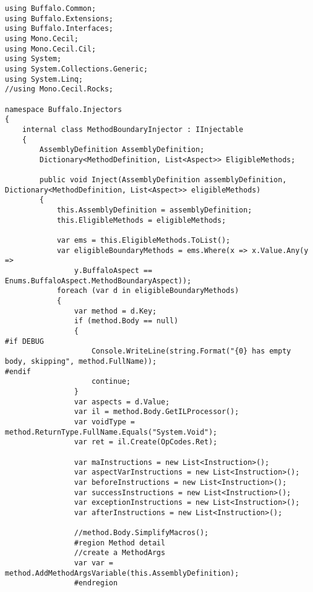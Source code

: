 \begin{lstlisting}[caption={../buffalo/Injectors/MethodBoundaryInjector.cs}, label=../buffalo/Injectors/MethodBoundaryInjector.cs, frame=tb, basicstyle=\scriptsize]﻿using Buffalo.Common;
using Buffalo.Extensions;
using Buffalo.Interfaces;
using Mono.Cecil;
using Mono.Cecil.Cil;
using System;
using System.Collections.Generic;
using System.Linq;
//using Mono.Cecil.Rocks;

namespace Buffalo.Injectors
{
    internal class MethodBoundaryInjector : IInjectable
    {
        AssemblyDefinition AssemblyDefinition;
        Dictionary<MethodDefinition, List<Aspect>> EligibleMethods;

        public void Inject(AssemblyDefinition assemblyDefinition, Dictionary<MethodDefinition, List<Aspect>> eligibleMethods)
        {
            this.AssemblyDefinition = assemblyDefinition;
            this.EligibleMethods = eligibleMethods;

            var ems = this.EligibleMethods.ToList();
            var eligibleBoundaryMethods = ems.Where(x => x.Value.Any(y =>
                y.BuffaloAspect == Enums.BuffaloAspect.MethodBoundaryAspect));
            foreach (var d in eligibleBoundaryMethods)
            {
                var method = d.Key;
                if (method.Body == null)
                {
#if DEBUG
                    Console.WriteLine(string.Format("{0} has empty body, skipping", method.FullName));
#endif
                    continue;
                }
                var aspects = d.Value;
                var il = method.Body.GetILProcessor();
                var voidType = method.ReturnType.FullName.Equals("System.Void");
                var ret = il.Create(OpCodes.Ret);

                var maInstructions = new List<Instruction>();
                var aspectVarInstructions = new List<Instruction>();
                var beforeInstructions = new List<Instruction>();
                var successInstructions = new List<Instruction>();
                var exceptionInstructions = new List<Instruction>();
                var afterInstructions = new List<Instruction>();

                //method.Body.SimplifyMacros();
                #region Method detail
                //create a MethodArgs
                var var = method.AddMethodArgsVariable(this.AssemblyDefinition);
                #endregion


\end{lstlisting}
